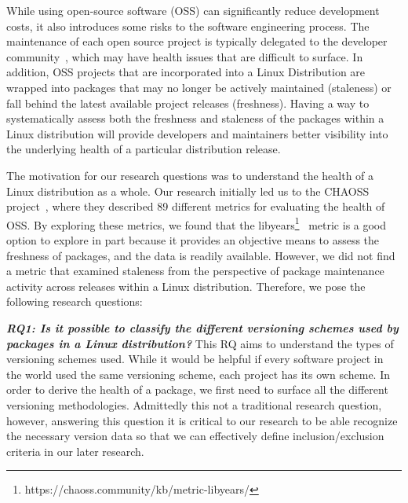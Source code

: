 \documentclass[sn-mathphys-num]{sn-jnl}%
\theoremstyle{thmstyleone}%
\theoremstyle{thmstyletwo}%
\theoremstyle{thmstylethree}%
\begin{document}

While using open-source software (OSS) can significantly reduce development costs, it also introduces some risks to the software engineering process. The maintenance of each open source project is typically delegated to the developer community~\cite{li_ossara_2022}, which may have health issues that are difficult to surface. In addition, OSS projects that are incorporated into a Linux Distribution are wrapped into packages that may no longer be actively maintained (staleness) or fall behind the latest available project releases (freshness). Having a way to systematically assess both the freshness and staleness of the packages within a Linux distribution will provide developers and maintainers better visibility into the underlying health of a particular distribution release.

The motivation for our research questions was to understand the health of a Linux distribution as a whole. Our research initially led us to the CHAOSS project~\cite{noauthor_metric_nodate}, where they described 89 different metrics for evaluating the health of OSS. By exploring these metrics, we found that the libyears\footnote{https://chaoss.community/kb/metric-libyears/}~\cite{noauthor_metric_nodate} metric is a good option to explore in part because it provides an objective means to assess the freshness of packages, and the data is readily available. However, we did not find a metric that examined staleness from the perspective of package maintenance activity across releases within a Linux distribution.  Therefore, we pose the following research questions:

\textit{\textbf{RQ1: Is it possible to classify the different versioning schemes used by packages in a Linux distribution?}}
This RQ aims to understand the types of versioning schemes used. While it would be helpful if every software project in the world used the same versioning scheme, each project has its own scheme. In order to derive the health of a package, we first need to surface all the different versioning methodologies. Admittedly this not a traditional research question, however, answering this question it is critical to our research to be able recognize the necessary version data so that we can effectively define inclusion/exclusion criteria in our later research.
\end{document}
